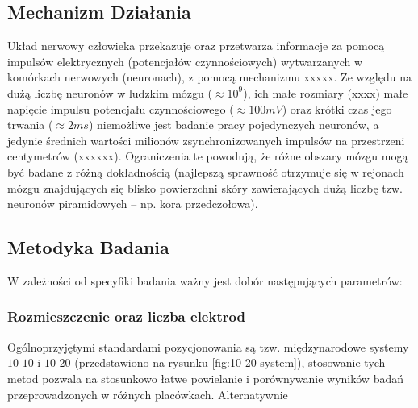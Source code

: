 \documentclass{./assets/wfis}
\begin{document}
\subsection{Mechanizm Działania}

Układ nerwowy człowieka przekazuje oraz przetwarza informacje za pomocą impulsów elektrycznych (potencjałów czynnościowych) wytwarzanych w komórkach nerwowych (neuronach), z pomocą mechanizmu xxxxx. Ze względu na dużą liczbę neuronów w ludzkim mózgu ($\approx10^9$\cite{herculano-houzel_human_2009}), ich małe rozmiary (xxxx) małe napięcie impulsu potencjału czynnościowego ($\approx100mV$\cite{biga_anatomy_2019}) oraz krótki czas jego trwania ($\approx2ms$\cite{biga_anatomy_2019}) niemożliwe jest badanie pracy pojedynczych neuronów, a jedynie średnich wartości milionów zsynchronizowanych impulsów na przestrzeni centymetrów (xxxxxx). Ograniczenia te powodują, że różne obszary mózgu mogą być badane z różną dokładnością (najlepszą sprawność otrzymuje się w rejonach mózgu znajdujących się blisko powierzchni skóry zawierających dużą liczbę tzw. neuronów piramidowych – np. kora przedczołowa).

\subsection{Metodyka Badania}

W zależności od specyfiki badania ważny jest dobór następujących parametrów:

\subsubsection{Rozmieszczenie oraz liczba elektrod}
Ogólnoprzyjętymi standardami pozycjonowania są tzw. międzynarodowe systemy $10$-$10$ i $10$-$20$ (przedstawiono na rysunku \ref{fig:10-20-system}), stosowanie tych metod pozwala na stosunkowo łatwe powielanie i porównywanie wyników badań przeprowadzonych w różnych placówkach. Alternatywnie 
\end{document}
